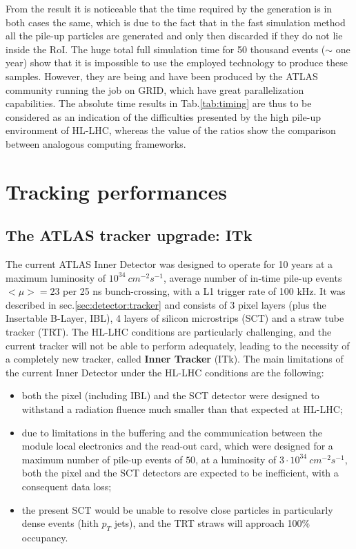 \documentclass[a4paper,twoside,12pt]{article}
\begin{document}
From the result it is noticeable that the time required by the generation is in both cases
the same, which is due to the fact that in the fast simulation method all the pile-up particles
are generated and only then discarded if they do not lie inside the RoI. The huge total full
simulation time for 50 thousand events ($\sim$ one year) show that it is impossible to use
the employed technology to produce these samples. However, they are being and 
have been produced by the ATLAS community running the job on GRID\cite{ATLASGrid}, which
have great parallelization capabilities. The absolute time results in Tab.\ref{tab:timing} are thus to be
considered as an indication of the difficulties presented by the high pile-up environment of
HL-LHC, whereas the value of the ratios show the comparison between analogous computing
frameworks.

\newpage

\section{Tracking performances}\label{sec:tracking}

\subsection{The ATLAS tracker upgrade: ITk}
The current ATLAS Inner Detector was designed to operate for 10 years at a maximum luminosity of $10^{34}\ cm^{-2} s^{-1}$, 
average number of in-time pile-up events $<\mu> = 23$ per 25 ns bunch-crossing, with a L1 trigger rate of 100 kHz\cite{loi}. It
was described in sec.\ref{sec:detector:tracker} and consists of 3 pixel layers (plus the Insertable B-Layer, IBL), 4 layers of silicon microstrips (SCT)
and a straw tube tracker (TRT). The HL-LHC conditions are particularly challenging, and the current tracker will not be able to perform adequately, leading to the necessity of a completely new tracker, called \textbf{Inner Tracker} (ITk). The main limitations of the current Inner Detector under the HL-LHC conditions are the following:

\begin{itemize}
\item both the pixel (including IBL) and the SCT detector were designed to withstand a radiation fluence much smaller
than that expected at HL-LHC;
\item due to limitations in the buffering and the communication between the module local electronics and the read-out card, which
were designed for a maximum number of pile-up events of $50$,
at a luminosity of $3 \cdot 10^{34}\ cm^{-2}s^{-1}$, both the pixel and the SCT detectors are expected to be inefficient, with
a consequent data loss;
\item the present SCT would be unable to resolve close particles in particularly dense events (hith $p_{T}$ jets), and the TRT straws
	will approach 100\% occupancy.
\end{itemize}
\end{document}
